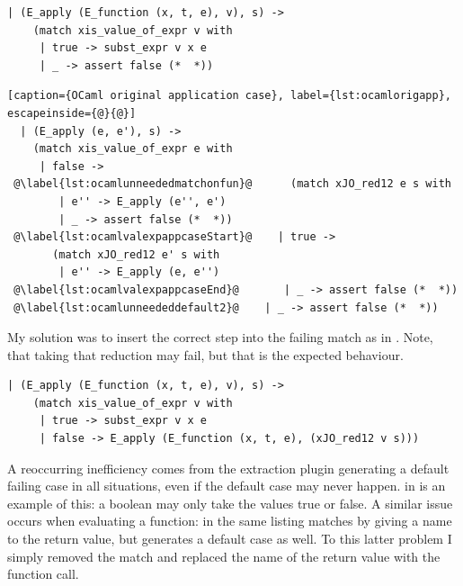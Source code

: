 \documentclass[12pt,twoside,notitlepage]{report}
\begin{document}
\begin{minipage}{\linewidth}

\begin{lstlisting}[caption={OCaml original substitution case}, label={lst:ocamlorigsub}]
  | (E_apply (E_function (x, t, e), v), s) ->
    (match xis_value_of_expr v with
     | true -> subst_expr v x e
     | _ -> assert false (*  *))
\end{lstlisting}

\end{minipage}

\begin{minipage}{\linewidth}

\begin{lstlisting}[caption={OCaml original application case}, label={lst:ocamlorigapp}, escapeinside={@}{@}]
  | (E_apply (e, e'), s) ->
    (match xis_value_of_expr e with
     | false ->
 @\label{lst:ocamlunneededmatchonfun}@      (match xJO_red12 e s with
        | e'' -> E_apply (e'', e')
        | _ -> assert false (*  *))
 @\label{lst:ocamlvalexpappcaseStart}@    | true ->
       (match xJO_red12 e' s with
        | e'' -> E_apply (e, e'')
 @\label{lst:ocamlvalexpappcaseEnd}@       | _ -> assert false (*  *))
 @\label{lst:ocamlunneededdefault2}@    | _ -> assert false (*  *))
\end{lstlisting}

\end{minipage}
My solution was to insert the correct step into the failing match as in . Note, that taking that reduction may fail, but that is the expected behaviour.
\begin{minipage}{\linewidth}

\begin{lstlisting}[caption={OCaml fixed substitution case}, label={lst:ocamlfixsub}]
  | (E_apply (E_function (x, t, e), v), s) ->
    (match xis_value_of_expr v with
     | true -> subst_expr v x e
     | false -> E_apply (E_function (x, t, e), (xJO_red12 v s)))
\end{lstlisting}

\end{minipage}
A reoccurring inefficiency comes from the extraction plugin generating a default failing case in all situations, even if the default case may never happen.  in  is an example of this: a boolean may only take the values true or false. A similar issue occurs when evaluating a function:   in the same listing matches by giving a name to the return value, but generates a default case as well. To this latter problem I simply removed the match and replaced the name of the return value with the function call.
\end{document}
